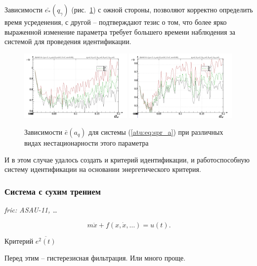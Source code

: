 \documentclass[a4paper,12pt]{article}
\newcommand{\LinkRef}[1]{ \textit{#1} }
\begin{document}
Зависимости $\bar{e_*}(q_\gamma)$ (рис.~\ref{atu:f:spr_a_e_a_q})
с ожной стороны, позволяют корректно определить время усреденения,
с другой -- подтверждают тезис о том, что более ярко выраженной изменение
параметра требует большего времени наблюдения за системой
для проведения идентификации.

\begin{figure}[htb!]
\centerline{
  \includegraphics[width=0.49\textwidth]{p/cha/spr_a/sprott_a_m5p-p_a_q_e_sign.png}
  \includegraphics[width=0.49\textwidth]{p/cha/spr_a/sprott_a_m5p-p_a_q_e_sin.png}
}
  \caption{Зависимости  $\bar{e}(a_q)$ для системы (\ref{atu:eq:spr_a})
  при различных видах нестационарности этого параметра
}
\label{atu:f:spr_a_e_a_q}
\end{figure}

И в этом случае удалось создать и критерий идентификации, и работоспособную систему идентификации
на основании энергетического критерия.



\FloatBarrier
\subsubsection{Система с сухим трением}

\LinkRef{
  fric: ASAU-11, \ldots
}

\begin{equation}
 m \ddot{x} + f( x, \dot{x}, \ldots)  = u(t).
\label{atu:eq:dryfric_example}
\end{equation}

Критерий
$\overline{e^2(t)}$

Перед этим -- гистерезисная фильтрация.
Или много проще.
\end{document}
